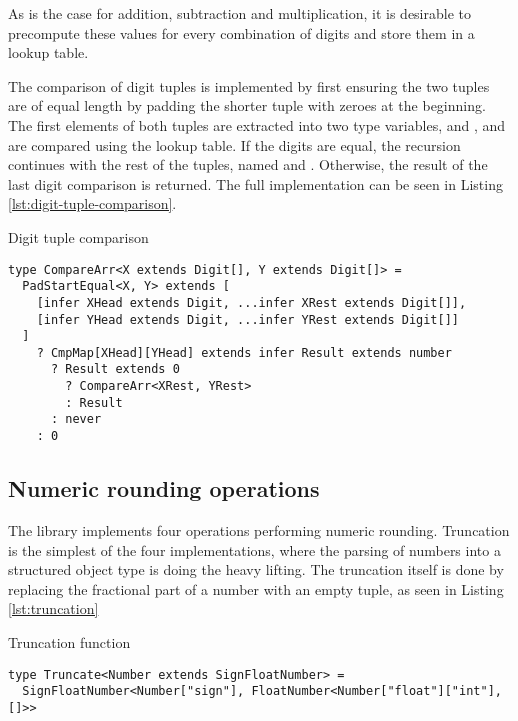 As is the case for addition, subtraction and multiplication, it is desirable to precompute these values for every combination of digits and store them in a lookup table.

The comparison of digit tuples is implemented by first ensuring the two tuples are of equal length by padding the shorter tuple with zeroes at the beginning. The first elements of both tuples are extracted into two type variables,  and , and are compared using the lookup table. If the digits are equal, the recursion continues with the rest of the tuples, named  and . Otherwise, the result of the last digit comparison is returned. The full implementation can be seen in Listing \ref{lst:digit-tuple-comparison}.

\begin{listing}[ht]
  \caption{Digit tuple comparison}\label{lst:digit-tuple-comparison}
  \begin{verbatim}
type CompareArr<X extends Digit[], Y extends Digit[]> = 
  PadStartEqual<X, Y> extends [
    [infer XHead extends Digit, ...infer XRest extends Digit[]],
    [infer YHead extends Digit, ...infer YRest extends Digit[]]
  ]
    ? CmpMap[XHead][YHead] extends infer Result extends number
      ? Result extends 0
        ? CompareArr<XRest, YRest>
        : Result
      : never
    : 0
\end{verbatim}
\end{listing}

\subsection{Numeric rounding operations}

The library implements four operations performing numeric rounding. Truncation is the simplest of the four implementations, where the parsing of numbers into a structured object type is doing the heavy lifting. The truncation itself is done by replacing the fractional part of a number with an empty tuple, as seen in Listing \ref{lst:truncation}

\begin{listing}[ht]
  \caption{Truncation function}\label{lst:truncation}
  \begin{verbatim}
type Truncate<Number extends SignFloatNumber> =
  SignFloatNumber<Number["sign"], FloatNumber<Number["float"]["int"], []>>
\end{verbatim}
\end{listing}

